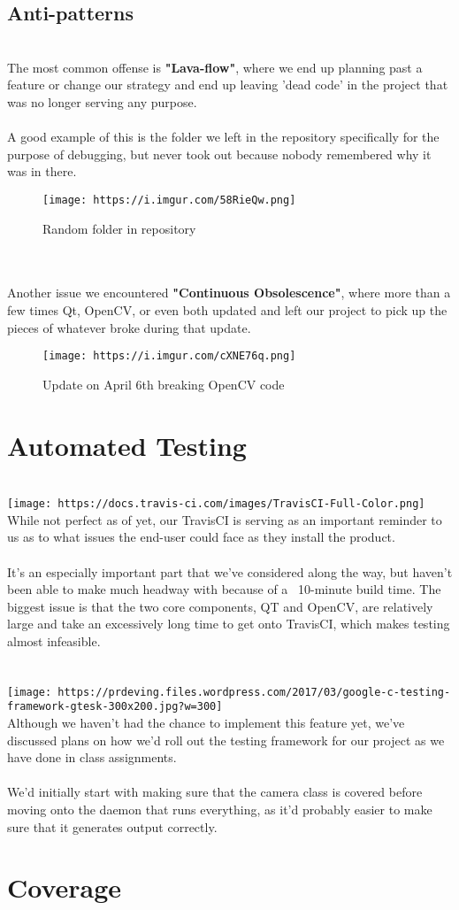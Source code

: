 \documentclass[12pt]{article}
\begin{document}
\subsection*{Anti-patterns}
\\The most common offense is \textbf{"Lava-flow"}, where we end up planning past a feature or change our strategy and end up leaving 'dead code' in the project that was no longer serving any purpose.
\\
\\A good example of this is the folder we left in the repository specifically for the purpose of debugging, but never took out because nobody remembered why it was in there.
\\\begin{figure}[h]
    \centering
    \texttt{[image: https://i.imgur.com/58RieQw.png]}
    \caption{Random folder in repository}
\end{figure}
\\
\\Another issue we encountered \textbf{"Continuous Obsolescence"}, where more than a few times Qt, OpenCV, or even both updated and left our project to pick up the pieces of whatever broke during that update.
\\\begin{figure}[width=0.25\textwidth]
    \centering
    \texttt{[image: https://i.imgur.com/cXNE76q.png]}
    \caption{Update on April 6th breaking OpenCV code}
\end{figure}
\pagebreak

\section*{Automated Testing}
\\\texttt{[image: https://docs.travis-ci.com/images/TravisCI-Full-Color.png]}
\\
While not perfect as of yet, our TravisCI is serving as an important reminder to us as to what issues the end-user could face as they install the product. 
\\
\\It's an especially important part that we've considered along the way, but haven't been able to make much headway with because of a ~10-minute build time. The biggest issue is that the two core components, QT and OpenCV, are relatively large and take an excessively long time to get onto TravisCI, which makes testing almost infeasible.
\\
\\
\\\texttt{[image: https://prdeving.files.wordpress.com/2017/03/google-c-testing-framework-gtesk-300x200.jpg?w=300]}
\\Although we haven't had the chance to implement this feature yet, we've discussed plans on how we'd roll out the testing framework for our project as we have done in class assignments. 
\\
\\We'd initially start with making sure that the camera class is covered before moving onto the daemon that runs everything, as it'd probably easier to make sure that it generates output correctly.
\pagebreak

\section*{Coverage}
\pagebreak
\end{document}
